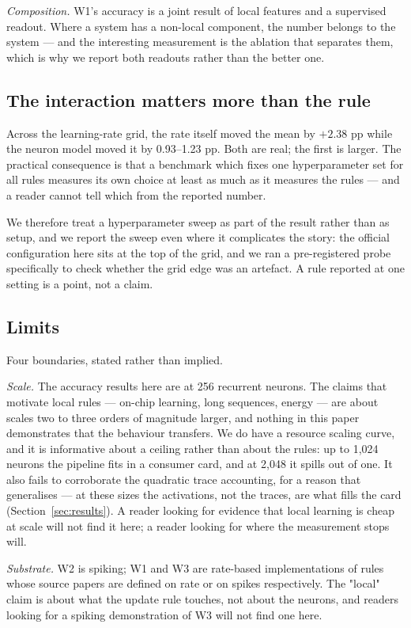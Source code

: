 \documentclass[11pt]{article}
\begin{document}
\emph{Composition.} W1's accuracy is a joint result of local features and a
supervised readout. Where a system has a non-local component, the number belongs
to the system --- and the interesting measurement is the ablation that separates
them, which is why we report both readouts rather than the better one.

\subsection{The interaction matters more than the rule}
Across the learning-rate grid, the rate itself moved the mean by $+2.38$ pp
while the neuron model moved it by 0.93--1.23 pp. Both are real; the first is
larger. The practical consequence is that a benchmark which fixes one
hyperparameter set for all rules measures its own choice at least as much as it
measures the rules --- and a reader cannot tell which from the reported number.

We therefore treat a hyperparameter sweep as part of the result rather than as
setup, and we report the sweep even where it complicates the story: the official
configuration here sits at the top of the grid, and we ran a pre-registered
probe specifically to check whether the grid edge was an artefact. A rule
reported at one setting is a point, not a claim.

\subsection{Limits}
Four boundaries, stated rather than implied.

\emph{Scale.} The accuracy results here are at 256 recurrent neurons. The claims
that motivate local rules --- on-chip learning, long sequences, energy --- are
about scales two to three orders of magnitude larger, and nothing in this paper
demonstrates that the behaviour transfers. We do have a resource scaling curve,
and it is informative about a ceiling rather than about the rules: up to 1{,}024
neurons the pipeline fits in a consumer card, and at 2{,}048 it spills out of one.
It also fails to corroborate the quadratic trace accounting, for a reason that
generalises --- at these sizes the activations, not the traces, are what fills
the card (Section~\ref{sec:results}). A reader looking for evidence that local
learning is cheap at scale will not find it here; a reader looking for where the
measurement stops will.

\emph{Substrate.} W2 is spiking; W1 and W3 are rate-based implementations of
rules whose source papers are defined on rate or on spikes respectively. The
"local" claim is about what the update rule touches, not about the neurons, and
readers looking for a spiking demonstration of W3 will not find one here.
\end{document}
